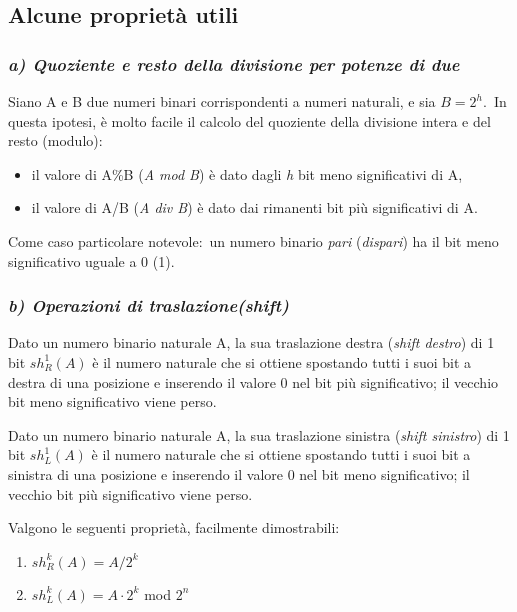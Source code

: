 \subsection{Alcune proprietà utili}

\subsubsection{\textit{a) Quoziente e resto della divisione per potenze di due}}

Siano A e B due numeri binari corrispondenti a numeri naturali, e sia $B = 2^h$.\
In questa ipotesi, è molto facile il calcolo del quoziente della divisione intera e del resto (modulo):

\begin{itemize}
    \item il valore di A\%B (\textit{A mod B}) è dato dagli \textit{h} bit meno significativi di A,
    \item il valore di A/B (\textit{A div B}) è dato dai rimanenti bit più significativi di A.
\end{itemize}

\noindent Come caso particolare notevole:\ un numero binario \textit{pari} (\textit{dispari}) ha il bit meno significativo uguale a 0 (1).

\subsubsection{\textit{b) Operazioni di traslazione(shift)}}

Dato un numero binario naturale A, la sua traslazione destra (\textit{shift destro}) di 1 bit $sh_R^1(A)$ è il numero naturale che si ottiene spostando tutti i suoi bit a destra di una posizione e inserendo il valore 0 nel bit più significativo; il vecchio bit meno significativo viene perso.

Dato un numero binario naturale A, la sua traslazione sinistra (\textit{shift sinistro}) di 1 bit $sh_L^1(A)$ è il numero naturale che si ottiene spostando tutti i suoi bit a sinistra di una posizione e inserendo il valore 0 nel bit meno significativo; il vecchio bit più significativo viene perso.

Valgono le seguenti proprietà, facilmente dimostrabili:

\begin{enumerate}
    \item $sh_R^k(A) = A/2^k$
    \item $sh_L^k(A) = A \cdot 2^k$ mod $2^n$
\end{enumerate}

